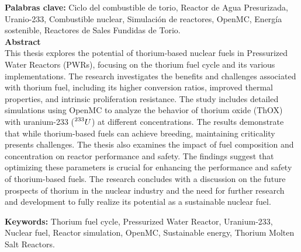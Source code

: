 \vspace{1.0cm}

\textbf{\small Palabras clave:} Ciclo del combustible de torio, Reactor de Agua Presurizada, Uranio-233, Combustible nuclear, Simulación de reactores, OpenMC, Energía sostenible, Reactores de Sales Fundidas de Torio.\\

\newpage
\textbf{\LARGE Abstract}\\

This thesis explores the potential of thorium-based nuclear fuels in Pressurized Water Reactors (PWRs), focusing on the thorium fuel cycle and its various implementations. The research investigates the benefits and challenges associated with thorium fuel, including its higher conversion ratios, improved thermal properties, and intrinsic proliferation resistance. The study includes detailed simulations using OpenMC to analyze the behavior of thorium oxide (ThOX) with uranium-233 (\(\prescript{233}{}{U}\)) at different concentrations. The results demonstrate that while thorium-based fuels can achieve breeding, maintaining criticality presents challenges. The thesis also examines the impact of fuel composition and concentration on reactor performance and safety. The findings suggest that optimizing these parameters is crucial for enhancing the performance and safety of thorium-based fuels. The research concludes with a discussion on the future prospects of thorium in the nuclear industry and the need for further research and development to fully realize its potential as a sustainable nuclear fuel.

\vspace{1.0cm}

\textbf{\small Keywords:} Thorium fuel cycle, Pressurized Water Reactor, Uranium-233, Nuclear fuel, Reactor simulation, OpenMC, Sustainable energy, Thorium Molten Salt Reactors.\\